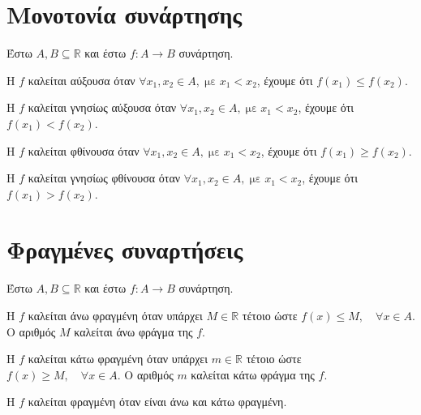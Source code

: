\section{Μονοτονία συνάρτησης}

\begin{dfn}
  Έστω $ A, B \subseteq \mathbb{R} $ και έστω $ f \colon A \to B $ συνάρτηση. 
  \begin{myitemize}
    \item Η $f$ καλείται \textcolor{Col1}{αύξουσα} όταν 
      $ \forall x_{1}, x_{2} \in A, \; \text{με} \; x_{1} < x_{2} $, έχουμε ότι 
      $ f(x_{1}) \leq f(x_{2}) $.
    \item Η $f$ καλείται \textcolor{Col1}{γνησίως αύξουσα} όταν 
      $ \forall x_{1}, x_{2} \in A, \; \text{με} \; x_{1} < x_{2} $, έχουμε ότι 
      $ f(x_{1}) < f(x_{2}) $.
    \item Η $f$ καλείται \textcolor{Col1}{φθίνουσα} όταν 
      $ \forall x_{1}, x_{2} \in A, \; \text{με} \; x_{1} < x_{2} $, έχουμε ότι 
      $ f(x_{1}) \geq f(x_{2}) $.
    \item Η $f$ καλείται \textcolor{Col1}{γνησίως φθίνουσα} όταν 
      $ \forall x_{1}, x_{2} \in A, \; \text{με} \; x_{1} < x_{2} $, έχουμε ότι 
      $ f(x_{1}) > f(x_{2}) $.
  \end{myitemize}
\end{dfn}

\section{Φραγμένες συναρτήσεις}

\begin{dfn}
  Έστω $ A, B \subseteq \mathbb{R} $ και έστω $ f \colon A \to B $ συνάρτηση. 
  \begin{myitemize}
    \item Η $f$ καλείται \textcolor{Col1}{άνω φραγμένη} όταν υπάρχει $ M \in \mathbb{R} $ τέτοιο ώστε 
      $ f(x) \leq M, \quad \forall x \in A $. Ο αριθμός $M$ καλείται
      \textcolor{Col1}{άνω φράγμα} της $f$.
    \item Η $f$ καλείται \textcolor{Col1}{κάτω φραγμένη} όταν υπάρχει $ m \in \mathbb{R} $ τέτοιο ώστε 
      $ f(x) \geq M, \quad \forall x \in A $. Ο αριθμός $m$ καλείται
      \textcolor{Col1}{κάτω φράγμα} της $f$.
    \item Η $f$ καλείται \textcolor{Col1}{φραγμένη} όταν είναι άνω και κάτω φραγμένη.
  \end{myitemize}
\end{dfn}

